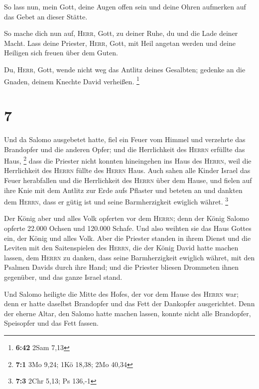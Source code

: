  So lass nun, mein Gott, deine Augen offen sein und deine
Ohren aufmerken auf das Gebet an dieser Stätte.

 So mache dich nun auf, \textsc{Herr}, Gott, zu deiner
Ruhe, du und die Lade deiner Macht. Lass deine Priester, \textsc{Herr},
Gott, mit Heil angetan werden und deine Heiligen sich freuen über dem
Guten.

 Du, \textsc{Herr}, Gott, wende nicht weg das Antlitz
deines Gesalbten; gedenke an die Gnaden, deinem Knechte David verheißen.
\footnote{\textbf{6:42} 2Sam 7,13}

\hypertarget{section-2}{%
\section{7}\label{section-2}}

 Und da Salomo ausgebetet hatte, fiel ein Feuer vom Himmel
und verzehrte das Brandopfer und die anderen Opfer; und die Herrlichkeit
des \textsc{Herrn} erfüllte das Haus, \footnote{\textbf{7:1} 3Mo 9,24;
  1Kö 18,38; 2Mo 40,34}  dass die Priester nicht konnten
hineingehen ins Haus des \textsc{Herrn}, weil die Herrlichkeit des
\textsc{Herrn} füllte des \textsc{Herrn} Haus.  Auch sahen
alle Kinder Israel das Feuer herabfallen und die Herrlichkeit des
\textsc{Herrn} über dem Hause, und fielen auf ihre Knie mit dem Antlitz
zur Erde aufs Pflaster und beteten an und dankten dem \textsc{Herrn},
dass er gütig ist und seine Barmherzigkeit ewiglich währet. \footnote{\textbf{7:3}
  2Chr 5,13; Ps 136,-1}

 Der König aber und alles Volk opferten vor dem
\textsc{Herrn};  denn der König Salomo opferte 22.000
Ochsen und 120.000 Schafe. Und also weihten sie das Haus Gottes ein, der
König und alles Volk.  Aber die Priester standen in ihrem
Dienst und die Leviten mit den Saitenspielen des \textsc{Herrn}, die der
König David hatte machen lassen, dem \textsc{Herrn} zu danken, dass
seine Barmherzigkeit ewiglich währet, mit den Psalmen Davids durch ihre
Hand; und die Priester bliesen Drommeten ihnen gegenüber, und das ganze
Israel stand.

 Und Salomo heiligte die Mitte des Hofes, der vor dem
Hause des \textsc{Herrn} war; denn er hatte daselbst Brandopfer und das
Fett der Dankopfer ausgerichtet. Denn der eherne Altar, den Salomo hatte
machen lassen, konnte nicht alle Brandopfer, Speisopfer und das Fett
fassen.

